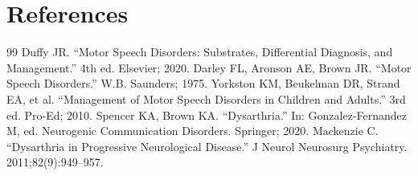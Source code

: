 \section*{References}
\begin{thebibliography}{99}
 Duffy JR. ``Motor Speech Disorders: Substrates, Differential Diagnosis, and Management.'' 4th ed. Elsevier; 2020.
 Darley FL, Aronson AE, Brown JR. ``Motor Speech Disorders.'' W.B. Saunders; 1975.
 Yorkston KM, Beukelman DR, Strand EA, et al. ``Management of Motor Speech Disorders in Children and Adults.'' 3rd ed. Pro-Ed; 2010.
 Spencer KA, Brown KA. ``Dysarthria.'' In: Gonzalez-Fernandez M, ed. Neurogenic Communication Disorders. Springer; 2020.
 Mackenzie C. ``Dysarthria in Progressive Neurological Disease.'' J Neurol Neurosurg Psychiatry. 2011;82(9):949--957.
\end{thebibliography}

